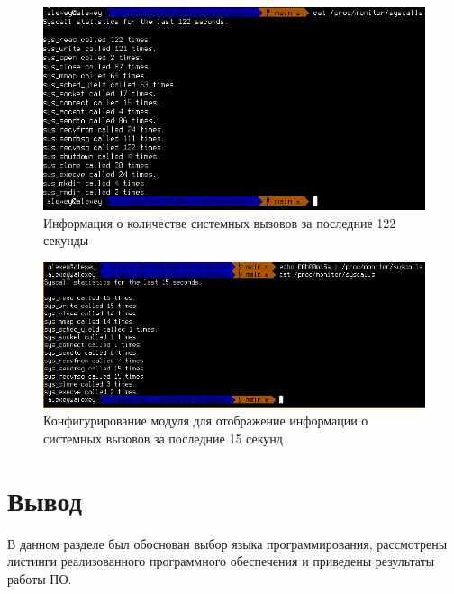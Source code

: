 \begin{figure}[h!]
	\begin{center}
		\includegraphics[scale=0.6]{img/syscalls_example_01.png}
	\end{center}
	\captionsetup{justification=centering}
	\caption{Информация о количестве системных вызовов за последние 122 секунды}
	\label{img:syscalls_example_01}
\end{figure}

\begin{figure}[h!]
	\begin{center}
		\includegraphics[scale=0.6]{img/syscalls_example_02.png}
	\end{center}
	\captionsetup{justification=centering}
	\caption{Конфигурирование модуля для отображение информации о системных вызовов за последние 15 секунд}
	\label{img:syscalls_example_02}
\end{figure}

\section*{Вывод}

В данном разделе был обоснован выбор языка программирования, рассмотрены листинги реализованного программного обеспечения и приведены результаты работы ПО.